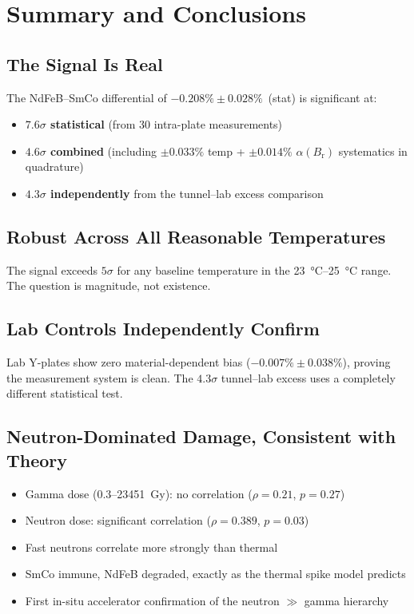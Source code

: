 \documentclass[11pt,letterpaper]{article}
\newcommand{\Br}{B_\mathrm{r}}
\newcommand{\alphar}{\alpha(\Br)}
\begin{document}
\section{Summary and Conclusions}
\label{sec:conclusions}

\subsection{The Signal Is Real}

The NdFeB--SmCo differential of $-0.208\% \pm 0.028\%$~(stat) is significant
at:
\begin{itemize}
    \item \textbf{$7.6\sigma$ statistical} (from 30 intra-plate measurements)
    \item \textbf{$4.6\sigma$ combined} (including $\pm 0.033\%$ temp +
    $\pm 0.014\%$ $\alphar$ systematics in quadrature)
    \item \textbf{$4.3\sigma$ independently} from the tunnel--lab excess
    comparison
\end{itemize}

\subsection{Robust Across All Reasonable Temperatures}

The signal exceeds $5\sigma$ for any baseline temperature in the
\SIrange{23}{25}{\celsius} range. The question is magnitude, not existence.

\subsection{Lab Controls Independently Confirm}

Lab Y-plates show zero material-dependent bias ($-0.007\% \pm 0.038\%$),
proving the measurement system is clean. The $4.3\sigma$ tunnel--lab excess
uses a completely different statistical test.

\subsection{Neutron-Dominated Damage, Consistent with Theory}

\begin{itemize}
    \item Gamma dose (0.3--\SI{23451}{Gy}): no correlation ($\rho = 0.21$,
    $p = 0.27$)
    \item Neutron dose: significant correlation ($\rho = 0.389$, $p = 0.03$)
    \item Fast neutrons correlate more strongly than thermal
    \item SmCo immune, NdFeB degraded, exactly as the thermal spike model
    predicts
    \item First in-situ accelerator confirmation of the neutron $\gg$ gamma
    hierarchy
\end{itemize}
\end{document}
